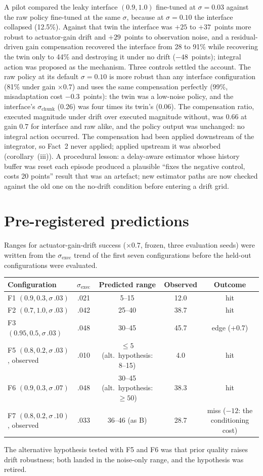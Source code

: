\documentclass{article}
\newcommand{\sexec}{\sigma_{\mathrm{exec}}}
\newcommand{\schunk}{\sigma_{\mathrm{chunk}}}
\begin{document}
A pilot compared the leaky interface $(0.9,1.0)$ fine-tuned at $\sigma=0.03$ against the raw policy fine-tuned at the same $\sigma$, because at $\sigma=0.10$ the interface collapsed (12.5\%). Against that twin the interface was $+25$ to $+37$~points more robust to actuator-gain drift and $+29$~points to observation noise, and a residual-driven gain compensation recovered the interface from 28 to 91\% while recovering the twin only to 44\% and destroying it under no drift ($-48$~points); integral action was proposed as the mechanism. Three controls settled the account. The raw policy at its default $\sigma=0.10$ is more robust than any interface configuration (81\% under gain $\times0.7$) and uses the same compensation perfectly (99\%, misadaptation cost $-0.3$~points): the twin was a low-noise policy, and the interface's $\schunk$ (0.26) was four times its twin's (0.06). The compensation ratio, executed magnitude under drift over executed magnitude without, was $0.66$ at gain $0.7$ for interface and raw alike, and the policy output was unchanged: no integral action occurred. The compensation had been applied downstream of the integrator, so Fact~2 never applied; applied upstream it was absorbed (corollary~(iii)). A procedural lesson: a delay-aware estimator whose history buffer was reset each episode produced a plausible ``fixes the negative control, costs 20 points'' result that was an artefact; new estimator paths are now checked against the old one on the no-drift condition before entering a drift grid.

\section{Pre-registered predictions}
\label{app:prereg}

Ranges for actuator-gain-drift success ($\times0.7$, frozen, three evaluation seeds) were written from the $\sexec$ trend of the first seven configurations before the held-out configurations were evaluated.

\begin{center}\small
\begin{tabular}{l c c c c}
\toprule
Configuration & $\sexec$ & Predicted range & Observed & Outcome \\
\midrule
F1 $(0.9,0.3,\sigma\,.03)$ & .021 & 5--15 & 12.0 & hit \\
F2 $(0.7,1.0,\sigma\,.03)$ & .042 & 25--40 & 38.7 & hit \\
F3 $(0.95,0.5,\sigma\,.03)$ & .048 & 30--45 & 45.7 & edge (+0.7) \\
F5 $(0.8,0.2,\sigma\,.03)$, observed & .010 & $\le5$ (alt.\ hypothesis: 8--15) & 4.0 & hit \\
F6 $(0.9,0.3,\sigma\,.07)$ & .048 & 30--45 (alt.\ hypothesis: $\ge50$) & 38.3 & hit \\
F7 $(0.8,0.2,\sigma\,.10)$, observed & .033 & 36--46 (as B) & 28.7 & miss ($-12$: the conditioning cost) \\
\bottomrule
\end{tabular}
\end{center}
The alternative hypothesis tested with F5 and F6 was that prior quality raises drift robustness; both landed in the noise-only range, and the hypothesis was retired.
\end{document}
